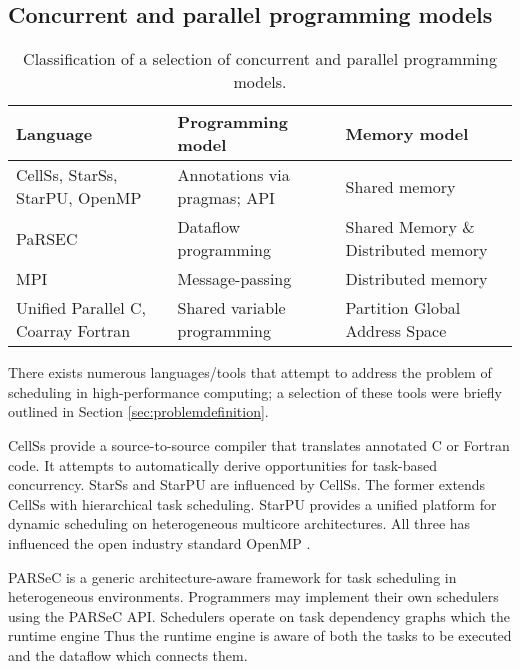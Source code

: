 \documentclass[preprint,10pt,numbers]{sigplanconf}
\begin{document}
  \subsection{Concurrent and parallel programming models}
\begin{table*}
\centering
\begin{tabular}{| l | l | l |}
\hline
 \textbf{Language}             & \textbf{Programming model} & \textbf{Memory model}\\
\hline
CellSs, StarSs, StarPU, OpenMP & Annotations via pragmas; API & Shared memory \\
\hline
PaRSEC                         & Dataflow programming & Shared Memory \& Distributed memory  \\
\hline
MPI & Message-passing          & Distributed memory  \\
\hline
Unified Parallel C, Coarray Fortran & Shared variable programming & Partition Global Address Space \\
\hline
\end{tabular}
\caption{Classification of a selection of concurrent and parallel programming models.}\label{tbl:models}
\end{table*}
There exists numerous languages/tools that attempt to address the problem of scheduling in high-performance computing; a selection of these tools were briefly outlined in Section \ref{sec:problemdefinition}.

CellSs \cite{Bellens2009} provide a source-to-source compiler that translates annotated C or Fortran code. It attempts to automatically derive opportunities for task-based concurrency. StarSs \cite{Planas2009} and StarPU \cite{Augonnet2011} are influenced by CellSs. The former extends CellSs with hierarchical task scheduling. StarPU provides a unified platform for dynamic scheduling on heterogeneous multicore architectures. All three has influenced the open industry standard OpenMP \cite{Openmp2013}. 

PARSeC \cite{Bosilca2013} is a generic architecture-aware framework for task scheduling in heterogeneous environments. Programmers may implement their own schedulers using the PARSeC API. Schedulers operate on task dependency graphs which the runtime engine
Thus the runtime engine is aware of both the tasks to be executed and the dataflow which connects them.
\end{document}

